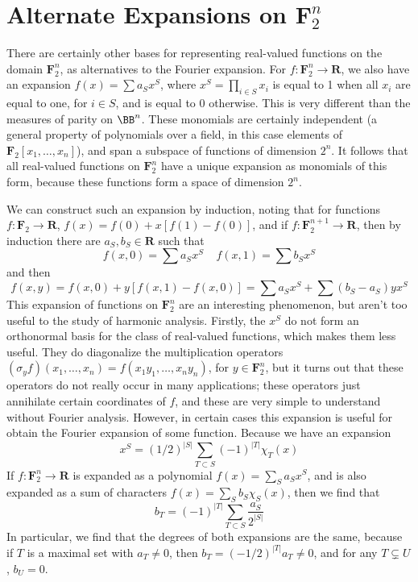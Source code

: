 \section{Alternate Expansions on $\mathbf{F}_2^n$}

There are certainly other bases for representing real-valued functions on the domain $\mathbf{F}_2^n$, as alternatives to the Fourier expansion. For $f: \mathbf{F}_2^n \to \mathbf{R}$, we also have an expansion $f(x) = \sum a_S x^S$, where $x^S = \prod_{i \in S} x_i$ is equal to 1 when all $x_i$ are equal to one, for $i \in S$, and is equal to 0 otherwise. This is very different than the measures of parity on $\BB^n$. These monomials are certainly independent (a general property of polynomials over a field, in this case elements of $\mathbf{F}_2[x_1, \dots, x_n]$), and span a subspace of functions of dimension $2^n$. It follows that all real-valued functions on $\mathbf{F}_2^n$ have a unique expansion as monomials of this form, because these functions form a space of dimension $2^n$.

We can construct such an expansion by induction, noting that for functions $f: \mathbf{F}_2 \to \mathbf{R}$, $f(x) = f(0) + x[f(1) - f(0)]$, and if $f: \mathbf{F}_2^{n+1} \to \mathbf{R}$, then by induction there are $a_S, b_S \in \mathbf{R}$ such that
%
\[ f(x,0) = \sum a_S x^S\ \ \ \ \ f(x,1) = \sum b_S x^S \]
%
and then
%
\[ f(x,y) = f(x,0) + y[f(x,1) - f(x,0)] = \sum a_S x^S + \sum (b_S - a_S) yx^S \]
%
This expansion of functions on $\mathbf{F}_2^n$ are an interesting phenomenon, but aren't too useful to the study of harmonic analysis. Firstly, the $x^S$ do not form an orthonormal basis for the class of real-valued functions, which makes them less useful. They do diagonalize the multiplication operators $(\sigma_y f)(x_1, \dots, x_n) = f(x_1y_1, \dots, x_ny_n)$, for $y \in \mathbf{F}^n_2$, but it turns out that these operators do not really occur in many applications; these operators just annihilate certain coordinates of $f$, and these are very simple to understand without Fourier analysis. However, in certain cases this expansion is useful for obtain the Fourier expansion of some function. Because we have an expansion
%
\[ x^S = \left( 1/2 \right)^{|S|} \sum_{T \subset S} (-1)^{|T|} \chi_T(x) \]
%
If $f: \mathbf{F}_2^n \to \mathbf{R}$ is expanded as a polynomial $f(x) = \sum_S a_S x^S$, and is also expanded as a sum of characters $f(x) = \sum_S b_S \chi_S(x)$, then we find that
%
\[ b_T = (-1)^{|T|} \sum_{T \subset S} \frac{a_S}{2^{|S|}}  \]
%
In particular, we find that the degrees of both expansions are the same, because if $T$ is a maximal set with $a_T \neq 0$, then $b_T = (-1/2)^{|T|} a_T \neq 0$, and for any $T \subsetneq U$, $b_U = 0$.

